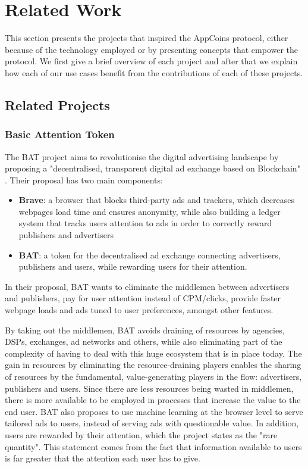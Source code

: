 \section{Related Work}

\label{sec:related}

This section presents the projects that inspired the AppCoins protocol, either because of the technology employed or by presenting concepts that empower the protocol. We first give a brief overview of each project and after that we explain how each of our use cases benefit from the contributions of each of these projects.

\subsection{Related Projects}

\subsubsection{Basic Attention Token}

The BAT project aims to revolutionise the digital advertising landscape by proposing a "decentralised, transparent digital ad exchange based on Blockchain" \cite{BAT}. Their proposal has two main components:

\begin{itemize}
	\item {\bf Brave}: a browser that blocks third-party ads and trackers, which decreases webpages load time and ensures anonymity, while also building a ledger system that tracks users attention to ads in order to correctly reward publishers and advertisers
	\item {\bf BAT}: a token for the decentralised ad exchange connecting advertisers, publishers and users, while rewarding users for their attention.
\end{itemize}

In their proposal, BAT wants to eliminate the middlemen between advertisers and publishers, pay for user attention instead of CPM/clicks, provide faster webpage loads and ads tuned to user preferences, amongst other features.

\medskip

By taking out the middlemen, BAT avoids draining of resources by agencies, DSPs, exchanges, ad networks and others, while also eliminating part of the complexity of having to deal with this huge ecosystem that is in place today. The gain in resources by eliminating the resource-draining players enables the sharing of resources by the fundamental, value-generating  players in the flow: advertisers, publishers and users. Since there are less resources being wasted in middlemen, there is more available to be employed in processes that increase the value to the end user. BAT also proposes to use machine learning at the browser level to serve tailored ads to users, instead of serving ads with questionable value. In addition, users are rewarded by their attention, which the project states as the "rare quantity". This statement comes from the fact that information available to users is far greater that the attention each user has to give.

